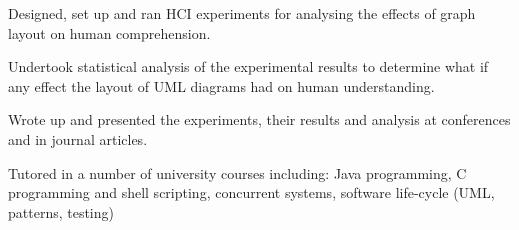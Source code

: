 \documentclass[a4paper]{awesome-deedy}
\begin{document}
\begin{minipage}[t]{0.66\textwidth}
\begin{tightemize}
\item Designed, set up and ran HCI experiments for analysing the effects of graph layout on human comprehension.
\item Undertook statistical analysis of the experimental results to determine what if any effect the layout of UML diagrams had on human understanding.
\item Wrote up and presented the experiments, their results and analysis at conferences and in journal articles.
\end{tightemize}
\sectionsep

\begin{tightemize}
\item Tutored in a number of university courses including: Java programming, C programming and shell scripting, concurrent systems, software life-cycle (UML, patterns, testing)
\end{tightemize}
\sectionsep





\end{minipage}
\end{document}
